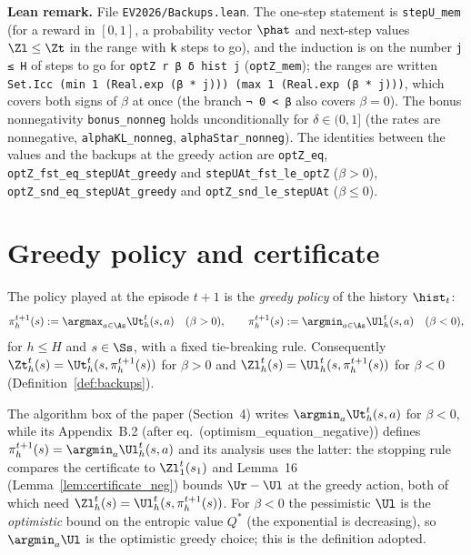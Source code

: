 \textbf{Lean remark.} File \texttt{EV2026/Backups.lean}. The one-step statement is
\texttt{stepU\_mem} (for a reward in $[0, 1]$, a probability vector $\phat$ and next-step values
$\Zl \le \Zt$ in the range with \texttt{k} steps to go), and the induction is on the number
\texttt{j ≤ H} of steps to go for \texttt{optZ r β δ hist j} (\texttt{optZ\_mem}); the ranges are
written \texttt{Set.Icc (min 1 (Real.exp (β * j))) (max 1 (Real.exp (β * j)))}, which covers both
signs of $\beta$ at once (the branch \texttt{¬ 0 < β} also covers $\beta = 0$). The bonus
nonnegativity \texttt{bonus\_nonneg} holds unconditionally for $\delta \in (0, 1]$ (the rates are
nonnegative, \texttt{alphaKL\_nonneg}, \texttt{alphaStar\_nonneg}). The identities between the
values and the backups at the greedy action are \texttt{optZ\_eq},
\texttt{optZ\_fst\_eq\_stepUAt\_greedy} and \texttt{stepUAt\_fst\_le\_optZ} ($\beta > 0$),
\texttt{optZ\_snd\_eq\_stepUAt\_greedy} and \texttt{optZ\_snd\_le\_stepUAt} ($\beta \le 0$).

\section{Greedy policy and certificate}
\label{sec:algorithm_certificate}

\begin{definition}\label{def:greedy}
\leanok
{}
The policy played at the episode $t + 1$ is the \emph{greedy policy} of the history $\hist_t$:
\[
  \pi^{t+1}_h(s) := \argmax_{a \in \As} \Ut^t_h(s, a) \quad (\beta > 0),
  \qquad
  \pi^{t+1}_h(s) := \argmin_{a \in \As} \Ul^t_h(s, a) \quad (\beta < 0),
\]
for $h \le H$ and $s \in \Ss$, with a fixed tie-breaking rule. Consequently
$\Zt^t_h(s) = \Ut^t_h(s, \pi^{t+1}_h(s))$ for $\beta > 0$ and $\Zl^t_h(s) = \Ul^t_h(s, \pi^{t+1}_h(s))$ for
$\beta < 0$ (Definition~\ref{def:backups}).
\end{definition}

\begin{remark}\label{rem:algorithm_greedy_neg}
The algorithm box of the paper (Section~4) writes $\argmin_a \Ut^t_h(s, a)$ for $\beta < 0$, while
its Appendix~B.2 (after eq.~(optimism\_equation\_negative)) defines $\pi^{t+1}_h(s) = \argmin_a \Ul^t_h(s, a)$
and its analysis uses the latter: the stopping rule compares the certificate to $\Zl^t_1(s_1)$
and Lemma~16 (Lemma~\ref{lem:certificate_neg}) bounds $\Ur - \Ul$ at the greedy action, both
of which need $\Zl^t_h(s) = \Ul^t_h(s, \pi^{t+1}_h(s))$. For $\beta < 0$ the pessimistic $\Ul$ is
the \emph{optimistic} bound on the entropic value $Q^*$ (the exponential is decreasing), so
$\argmin_a \Ul$ is the optimistic greedy choice; this is the definition adopted.
\end{remark}

